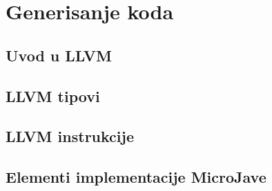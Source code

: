 \chapter{Generisanje koda}

\section{Uvod u LLVM}

\section{LLVM tipovi}

\section{LLVM instrukcije}

\section{Elementi implementacije MicroJave}
